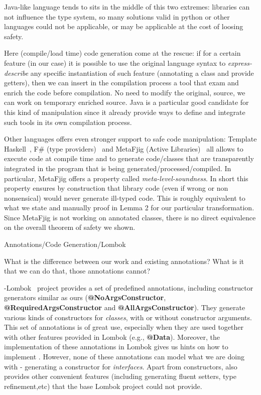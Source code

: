 Java-like language tends to sits in the middle of this two extremes:
libraries can not influence the type system, so many solutions valid in python or other languages could not be applicable, or may be applicable at the cost of loosing safety.

Here (compile/load time) code generation come at the rescue: 
if for a certain feature (\mixin in our case) it is possible to use the original language syntax to
\emph{express-describe} any specific instantiation of such feature
(annotating a class and provide getters), then we can insert in the compilation process a tool that exam and enrich the code before compilation. No need to modify the original, source, we can work on temporary enriched source.
Java is a particular good candidate for this kind of manipulation since it already provide ways to define and integrate such tools in its own compilation process.

Other languages offers even stronger support to safe code manipulation:
Template Haskell~\cite{}, F\# (type providers)~\cite{} and MetaFjig (Active Libraries)~\cite{}
all allows to execute code at compile time and to generate code/classes that are transparently integrated in the program that is being generated/processed/compiled.
In particular, MetaFjig offers a property called \emph{meta-level-soundness}. In short this property ensures by construction that library code (even if wrong or non nonsensical) would never generate ill-typed code. This is roughly equivalent to what we state and manually proof in Lemma 2 for our particular transformation.
Since MetaFjig is not working on annotated classes, there is no direct equivalence on the overall theorem of safety we shown.


Annotations/Code Generation/Lombok

What is the difference between our work and existing annotations?
What is it that we can do that, those annotations cannot?

-Lombok~\cite{} project provides a set of predefined annotations, including
constructor generators similar as ours (\textbf{@NoArgsConstructor},
\textbf{@RequiredArgsConstructor} and \textbf{@AllArgsConstructor}). They
generate various kinds of constructors for \emph{classes}, with or without
constructor arguments. This set of annotations is of great use, especially when
they are used together with other features provided in Lombok (e.g.,
\textbf{@Data}). Moreover, the implementation of these annotations in Lombok
gives us hints on how to implement \mixin. However, none of these annotations
can model what we are doing with \mixin - generating a constructor for
\emph{interfaces}. Apart from constructors, \mixin also provides other
convenient features (including generating fluent setters, type refinement,etc)
that the base Lombok project could not provide.

